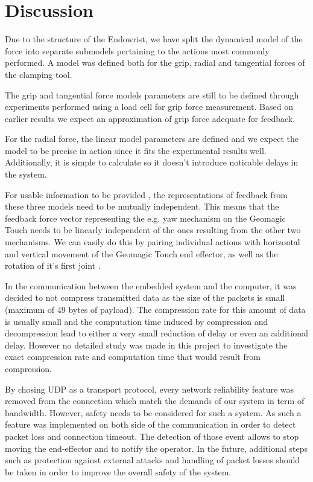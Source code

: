 \section{Discussion}
Due to the structure of the Endowrist, we have split the dynamical model of the force into separate submodels pertaining to the actions most commonly performed.
A model was defined both for the grip, radial and tangential forces of the clamping tool.

The grip and tangential force models parameters are still to be defined through experiments performed using a load cell for grip force measurement.
Based on earlier results \cite{kim2014dynamic} we expect an approximation of grip force adequate for feedback.

For the radial force, the linear model parameters are defined and we expect the model to be precise in action since it fits the experimental results well.
Additionally, it is simple to calculate so it doesn't introduce noticable delays in the system.

For usable information to be provided , the representations of feedback from these three models need to be mutually independent.
This means that the feedback force vector representing the e.g. yaw mechanism on the Geomagic Touch needs to be linearly independent of the ones resulting from the other two mechanisms. 
We can easily do this by pairing individual actions with horizontal and vertical movement of the Geomagic Touch end effector, as well as the rotation of it's first joint .

In the communication between the embedded system and the computer, it was decided to not compress transmitted data as the size of the packets is small (maximum of 49 bytes of payload). The compression rate for this amount of data is usually small and the computation time induced by compression and decompression lead to either a very small reduction of delay or even an additional delay. However no detailed study was made in this project to investigate the exact compression rate and computation time that would result from compression.

By chosing UDP as a transport protocol, every network reliability feature was removed from the connection which match the demands of our system in term of bandwidth. 
However, safety needs to be considered for such a system. 
As such a feature was implemented on both side of the communication in order to detect packet loss and connection timeout. 
The detection of those event allows to stop moving the end-effector and to notify the operator. 
In the future, additional steps such as protection against external attacks and handling of packet losses should be taken in order to improve the overall safety of the system.
